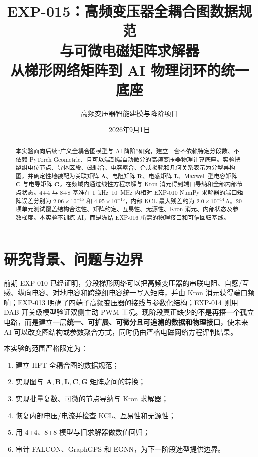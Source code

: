 \documentclass[11pt,a4paper]{ctexart}
\title{\vspace{-1.2cm}\textbf{EXP-015：高频变压器全耦合图数据规范\\与可微电磁矩阵求解器}\\[0.5em]\large 从梯形网络矩阵到 AI 物理闭环的统一底座}
\author{高频变压器智能建模与降阶项目}
\date{2026年9月1日}
\newcommand{\mat}[1]{\bm{#1}}
\begin{document}
\maketitle
\begin{abstract}
本实验面向后续“广义全耦合图模型与 AI 降阶”研究，建立一套不依赖特定分段数、不依赖 PyTorch Geometric、且可以端到端自动微分的高频变压器物理计算底座。实验把绕组电位节点、导体区段、磁耦合、电容耦合、介质损耗和几何关系表示为分型异构图，并确定性地装配为关联矩阵 \(\mat A\)、电阻矩阵 \(\mat R\)、电感矩阵 \(\mat L\)、Maxwell 型电容矩阵 \(\mat C\) 与电导矩阵 \(\mat G\)。在频域内通过线性方程求解与 Kron 消元得到端口导纳和全部内部节点状态。4+4 与 8+8 基准在 1~kHz--10~MHz 内相对 EXP-010 NumPy 求解器的端口矩阵误差分别为 \(2.06\times10^{-15}\) 和 \(4.95\times10^{-15}\)，内部 KCL 最大残差约为 \(2.0\times10^{-14}\,\mathrm A\)。20 项单元测试覆盖结构合法性、矩阵约定、互易性、无源性、Kron 消元、内部状态及参数梯度。本实验不训练 AI，而是冻结 EXP-016 所需的物理接口和可信回归基线。
\end{abstract}

\tableofcontents
\clearpage

\section{研究背景、问题与边界}

前期 EXP-010 已经证明，分段梯形网络可以把高频变压器的串联电阻、自感/互感、纵向电容、对地电容和跨绕组电容统一写入矩阵，并由 Kron 消元获得端口频响；EXP-013 明确了四端子高频变压器的接线与参数化结构；EXP-014 则用 DAB 开关级模型验证双侧主动 PWM 工况。现阶段真正缺少的不是再搭一个孤立电路，而是建立一层\textbf{统一、可扩展、可微分且可追溯的数据和物理接口}，使未来 AI 可以改变图结构或参数聚合方式，同时仍由严格电磁网络方程评判结果。

本实验的范围严格限定为：
\begin{enumerate}
  \item 建立 HFT 全耦合图的数据规范；
  \item 实现图与 \(\mat A,\mat R,\mat L,\mat C,\mat G\) 矩阵之间的转换；
  \item 实现批量复数、可微的节点导纳与 Kron 求解器；
  \item 恢复内部电压/电流并检查 KCL、互易性和无源性；
  \item 用 4+4、8+8 模型与旧求解器做数值回归；
  \item 审计 FALCON、GraphGPS 和 EGNN，为下一阶段选型提供边界。
\end{enumerate}
\end{document}
